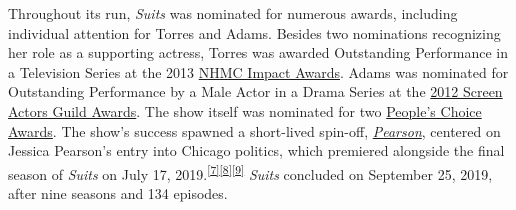 \documentclass[
  letterpaper,
  DIV=11,
  numbers=noendperiod]{scrartcl}
\begin{document}
Throughout its run, \emph{Suits} was nominated for numerous awards,
including individual attention for Torres and Adams. Besides two
nominations recognizing her role as a supporting actress, Torres was
awarded Outstanding Performance in a Television Series at the 2013
\href{https://en.wikipedia.org/wiki/National_Hispanic_Media_Coalition}{NHMC
Impact Awards}. Adams was nominated for Outstanding Performance by a
Male Actor in a Drama Series at the
\href{https://en.wikipedia.org/wiki/18th_Screen_Actors_Guild_Awards}{2012
Screen Actors Guild Awards}. The show itself was nominated for two
\href{https://en.wikipedia.org/wiki/People\%27s_Choice_Awards}{People's
Choice Awards}. The show's success spawned a short-lived spin-off,
\href{https://en.wikipedia.org/wiki/Pearson_(TV_series)}{\emph{Pearson}},
centered on Jessica Pearson's entry into Chicago politics, which
premiered alongside the final season of \emph{Suits} on July 17,
2019.\textsuperscript{\href{https://en.wikipedia.org/wiki/Suits_(American_TV_series)\#cite_note-USA_Network-8}{{[}7{]}}\href{https://en.wikipedia.org/wiki/Suits_(American_TV_series)\#cite_note-9}{{[}8{]}}\href{https://en.wikipedia.org/wiki/Suits_(American_TV_series)\#cite_note-Pearson_Premiere_Date-10}{{[}9{]}}}
\emph{Suits} concluded on September 25, 2019, after nine seasons and 134
episodes.
\end{document}
